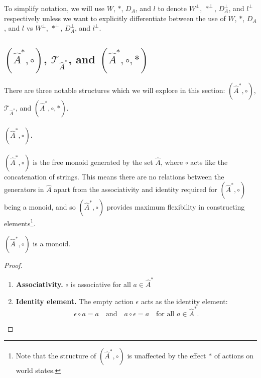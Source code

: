 To simplify notation, we will use $W$, $\ast$, $D_{A}$, and $l$ to denote $W^{\bot}$, $\ast^{\bot}$, $D_{A}^{\bot}$, and $l^{\bot}$ respectively unless we want to explicitly differentiate between the use of $W$, $\ast$, $D_{A}$, and $l$ vs $W^{\bot}$, $\ast^{\bot}$, $D_{A}^{\bot}$, and $l^{\bot}$.


\subsection{$(\hat{A}^{\ast}, \circ)$, $\mathcal{T}_{\hat{A}^{\ast}}$, and $(\hat{A}^{\ast}, \circ, \ast)$}

There are three notable structures which we will explore in this section: $(\hat{A}^{\ast}, \circ)$, $\mathcal{T}_{\hat{A}^{\ast}}$, and $(\hat{A}^{\ast}, \circ, \ast)$.

\paragraph{$(\hat{A}^{\ast}, \circ)$.}
$(\hat{A}^{\ast}, \circ)$ is the free monoid generated by the set $\hat{A}$, where $\circ$ acts like the concatenation of strings.
This means there are no relations between the generators in $\hat{A}$ apart from the associativity and identity required for $(\hat{A}^{\ast}, \circ)$ being a monoid, and so $(\hat{A}^{\ast}, \circ)$ provides maximum flexibility in constructing elements\footnote{Note that the structure of $(\hat{A}^{\ast}, \circ)$ is unaffected by the effect $\ast$ of actions on world states.}.
\begin{proposition}
    $(\hat{A}^{\ast}, \circ)$ is a monoid.
\end{proposition}
\begin{proof}
    \begin{enumerate}[(1)]
    \item \textbf{Associativity.}
        $\circ$ is associative for all $a \in \hat{A}^{\ast}$
    \item \textbf{Identity element.}
        The empty action $\epsilon$ acts as the identity element:
        \begin{equation}
            \epsilon \circ a = a \quad \text{and} \quad a \circ \epsilon = a \quad \text{for all } a \in \hat{A}^{\ast}.
        \end{equation}
    \end{enumerate}
\end{proof}

